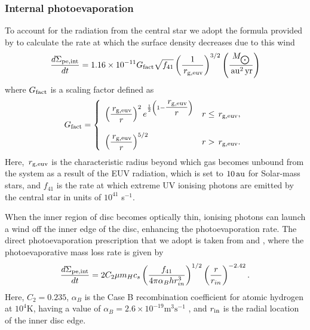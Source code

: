\documentclass[a4paper,fleqn,usenatbib]{mnras}
\newcommand{\au}{{\, {\rm au}}}
\newcommand{\rgeuv}{{\, {r_{\rm g, euv}}}}
\begin{document}
\subsubsection{Internal photoevaporation}
To account for the radiation from the central star we adopt the formula provided by \citet{Dullemond} to calculate the rate at which the surface density decreases due to this wind
\begin{equation}
\dfrac{d\Sigma_{\rm pe,int}}{dt} = 1.16\times10^{-11}G_{\rm fact}\sqrt{f_{41}}\left(\dfrac{1}{\rgeuv}\right)^{3/2}
\left(\dfrac{M_{\bigodot}}{\au^2 \, {\rm yr}}\right)
\end{equation}
where $G_{\rm fact}$ is a scaling factor defined as
\begin{equation}
G_{\rm fact} = \left\{ \begin{array}{ll}
\left(\dfrac{\rgeuv}{r}\right)^2 e^{\frac{1}{2}\left(1-\dfrac{\rgeuv}{r}\right)} 
& r\le \rgeuv, \\
\\
\left(\dfrac{\rgeuv}{r}\right)^{5/2} & r>\rgeuv.
\end{array} \right.
\end{equation}
Here, $\rgeuv$ is the characteristic radius beyond which gas becomes unbound from the system as a result of the EUV radiation, which is set to $10\au$ for Solar-mass stars, and $f_{41}$ is the rate at which extreme UV ionising photons are emitted by the central star in units of $10^{41}$ s$^{-1}$.

When the inner region of disc becomes optically thin, ionising photons can launch a wind off the inner edge of the disc, enhancing the photoevaporation rate.
The direct photoevaporation prescription that we adopt is taken from \citet{Alexander07} and \citet{Alexander09}, where the photoevaporative mass loss rate is given by 
\begin{equation}
\dfrac{d\Sigma_{\rm pe,int}}{dt}=2C_2\mu m_Hc_s\left(\dfrac{f_{41}}{4\pi\alpha_Bhr^3_{in}}\right)^{1/2}
\left(\dfrac{r}{r_{in}}\right)^{-2.42}.
\end{equation}
Here, $C_2=0.235$, $\alpha_{B}$ is the Case B recombination coefficient for atomic hydrogen at $10^4$K, having a value of $\alpha_B=2.6\times10^{-19}\text{m}^3\text{s}^{-1}$ \citep{Cox}, and $r_{\rm in}$ is the radial location of the inner disc edge.
\end{document}
